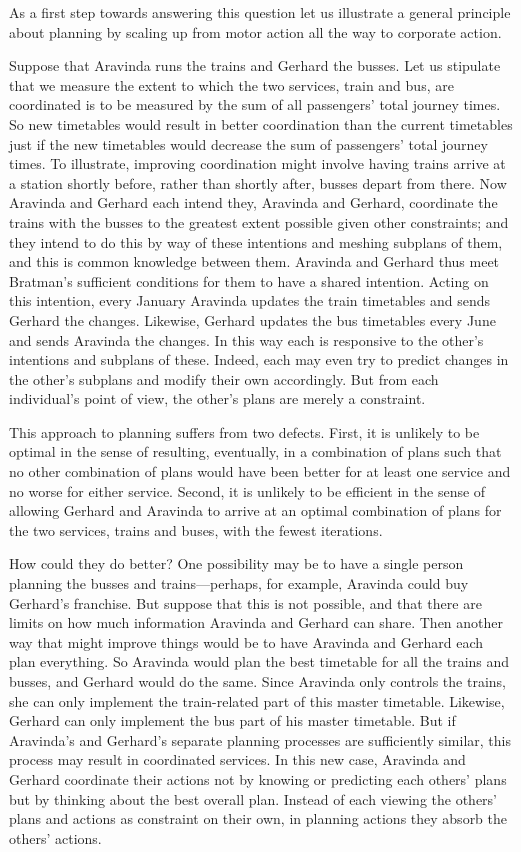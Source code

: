 \documentclass[12pt,\papersize]{extarticle}
\begin{document}
As a first step towards answering  this question let us illustrate a general principle about planning by scaling up from motor action all the way to corporate action.

Suppose that Aravinda runs the trains and Gerhard  the busses.
Let us stipulate that we measure the extent to which the two services, train and bus, are coordinated is to be measured by the sum of all passengers' total journey times.
So new timetables would result in better coordination than the current timetables just if the new timetables would decrease the sum of passengers' total journey times.
To illustrate, improving coordination might involve having trains arrive at a station shortly before, rather than shortly after, busses depart from there.
Now Aravinda and Gerhard each intend they, Aravinda and Gerhard, coordinate the trains with the busses  to the greatest extent possible given other constraints; and they intend to do this by way of these intentions and meshing subplans of them, and this is common knowledge between them. 
Aravinda and Gerhard thus meet Bratman's sufficient conditions for them to have a shared intention.
Acting on this intention, 
every January Aravinda updates the train timetables and sends Gerhard the changes.
Likewise, Gerhard  updates the bus timetables every June and sends Aravinda the changes.
In this way  each is responsive to the other's intentions and subplans of these. 
Indeed, each may even try to predict changes in the other's subplans and modify their own accordingly.  
But from each individual's point of view, the other's plans are  merely a constraint.

This approach to planning suffers from two defects.
First, it is unlikely to be optimal in the sense of resulting, eventually, in a combination of plans such that no other combination of plans would have been better for at least one service and no worse for either service.
Second, it is unlikely to be efficient in the sense of allowing Gerhard and Aravinda to arrive at an optimal combination of plans for the two services, trains and buses, with the fewest iterations.

How could they do better?
One possibility may be to have a single person planning the busses and trains---perhaps, for example, Aravinda could buy Gerhard's franchise. 
But suppose that this is not possible, and that there are limits on how much information Aravinda and Gerhard can share. 
Then another way that might improve things would be to have Aravinda and Gerhard each plan everything.
So Aravinda would plan the best timetable for all the trains and busses, and Gerhard would do the same.
Since Aravinda only controls the trains, she can only implement the train-related part of this master timetable.
Likewise, Gerhard can only implement the bus part of his master timetable.
But if Aravinda's and Gerhard's separate planning processes are sufficiently similar, this process may result in coordinated services.
In this new case, 
Aravinda and Gerhard coordinate their actions 
not by knowing or predicting each others' plans 
but by thinking about the best overall plan.
Instead of each viewing the others' plans and actions as constraint on their own,
in planning actions they absorb the others' actions.
\end{document}
